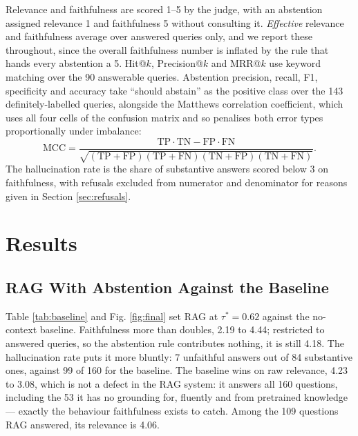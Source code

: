 \documentclass[conference]{IEEEtran}
\begin{document}
Relevance and faithfulness are scored 1--5 by the judge, with an abstention assigned relevance 1 and faithfulness 5 without consulting it. \emph{Effective} relevance and faithfulness average over answered queries only, and we report these throughout, since the overall faithfulness number is inflated by the rule that hands every abstention a 5. Hit@$k$, Precision@$k$ and MRR@$k$ use keyword matching over the 90 answerable queries. Abstention precision, recall, F1, specificity and accuracy take ``should abstain'' as the positive class over the 143 definitely-labelled queries, alongside the Matthews correlation coefficient, which uses all four cells of the confusion matrix and so penalises both error types proportionally under imbalance:
\begin{equation}
\text{MCC} = \frac{\text{TP}\!\cdot\!\text{TN} - \text{FP}\!\cdot\!\text{FN}}
{\sqrt{(\text{TP}+\text{FP})(\text{TP}+\text{FN})(\text{TN}+\text{FP})(\text{TN}+\text{FN})}} .
\end{equation}
The hallucination rate is the share of substantive answers scored below 3 on faithfulness, with refusals excluded from numerator and denominator for reasons given in Section \ref{sec:refusals}.

\section{Results}

\subsection{RAG With Abstention Against the Baseline}

Table \ref{tab:baseline} and Fig. \ref{fig:final} set RAG at $\tau^\ast = 0.62$ against the no-context baseline. Faithfulness more than doubles, 2.19 to 4.44; restricted to answered queries, so the abstention rule contributes nothing, it is still 4.18. The hallucination rate puts it more bluntly: 7 unfaithful answers out of 84 substantive ones, against 99 of 160 for the baseline. The baseline wins on raw relevance, 4.23 to 3.08, which is not a defect in the RAG system: it answers all 160 questions, including the 53 it has no grounding for, fluently and from pretrained knowledge --- exactly the behaviour faithfulness exists to catch. Among the 109 questions RAG answered, its relevance is 4.06.
\end{document}
